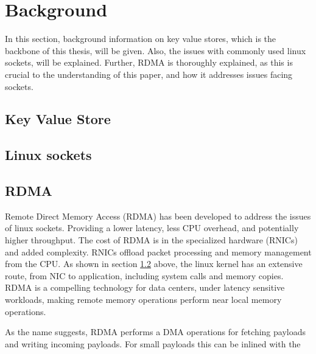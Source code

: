 
\chapter{Background}\label{ch:background} %



\ifpdf
    \graphicspath{{7/figures/PNG/}{7/figures/PDF/}{7/figures/}}
\else
    \graphicspath{{7/figures/EPS/}{7/figures/}}
\fi


%
%
In this section, background information on key value stores, which is the backbone of this thesis, will be given.
Also, the issues with commonly used linux sockets, will be explained.
Further, RDMA is thoroughly explained, as this is crucial to the understanding of this paper, and how it addresses issues facing sockets.

\section[KV-store]{Key Value Store}\label{sec:kv-store}

\section[Linux scokets]{Linux sockets}\label{sec:linux-sockets}

\section[RDMA]{RDMA}\label{sec:rdma}
Remote Direct Memory Access (RDMA) has been developed to address the issues of linux sockets.
Providing a lower latency, less CPU overhead, and potentially higher throughput.
The cost of RDMA is in the specialized hardware (RNICs) and added complexity.
RNICs offload packet processing and memory management from the CPU.
As shown in section \ref{sec:linux-sockets} above, the linux kernel has an extensive route, from NIC to application, including system calls and memory copies.
RDMA is a compelling technology for data centers, under latency sensitive workloads, making remote memory operations perform near local memory operations.

As the name suggests, RDMA performs a DMA operations for fetching payloads and writing incoming payloads.
For small payloads this can be inlined with the

